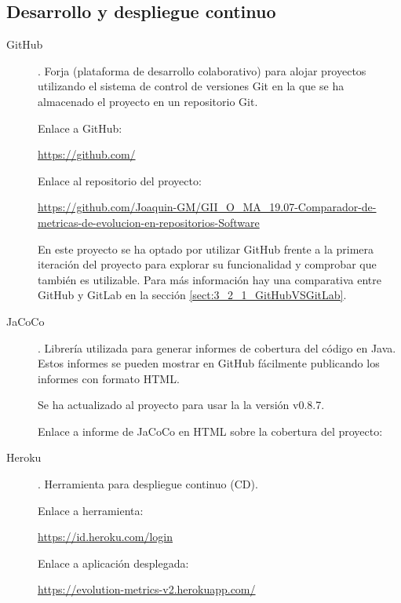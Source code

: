 \subsection{Desarrollo y despliegue continuo}
\begin{description}
	\item[GitHub]. Forja (plataforma de desarrollo colaborativo) para alojar proyectos utilizando el sistema de control de versiones Git en la que se ha almacenado el proyecto en un repositorio Git.
	
		Enlace a GitHub:
		
		\url{https://github.com/}
		
		Enlace al repositorio del proyecto:
		
		\url{https://github.com/Joaquin-GM/GII_O_MA_19.07-Comparador-de-metricas-de-evolucion-en-repositorios-Software}
		
		En este proyecto se ha optado por utilizar GitHub frente a la primera iteración del proyecto \cite{TFGPrevio} para explorar su funcionalidad y comprobar que también es utilizable. Para más información hay una comparativa entre GitHub y GitLab en la sección \ref{sect:3_2_1_GitHubVSGitLab}.
		
	
		 
		 
		 
	
	\item[JaCoCo]. Librería utilizada para generar informes de cobertura del código en Java. Estos informes se pueden mostrar en GitHub fácilmente publicando los informes con formato HTML. 
	
		Se ha actualizado al proyecto para usar la la versión v0.8.7. 
		
		
		
		Enlace a informe de JaCoCo en HTML sobre la cobertura del proyecto:
		
	
	\item[Heroku]. Herramienta para despliegue continuo (CD).
	
		Enlace a herramienta:
		
		\url{https://id.heroku.com/login}
		
		Enlace a aplicación desplegada:
		
		\url{https://evolution-metrics-v2.herokuapp.com/}
	
\end{description}
